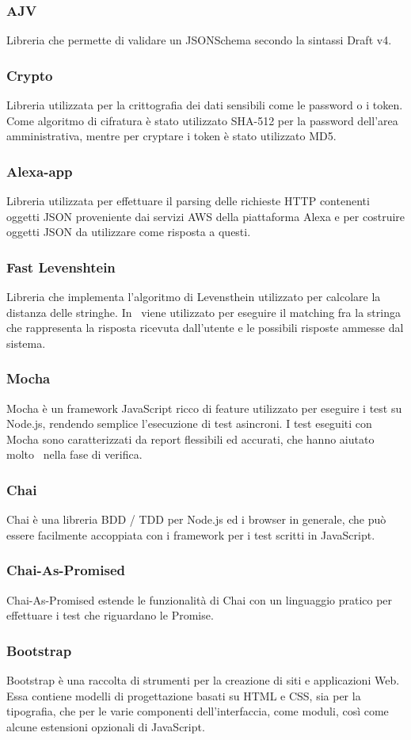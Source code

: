 \documentclass[../ManualeSviluppatore_v1.0.0.tex]{subfiles}
\begin{document}
		\subsubsection{AJV}
			Libreria che permette di validare un JSONSchema secondo la sintassi Draft v4.
		\subsubsection{Crypto}
			Libreria utilizzata per la crittografia dei dati sensibili come le password o i token. Come algoritmo di cifratura è stato utilizzato SHA-512 per la password dell'area amministrativa, mentre per cryptare i token è stato utilizzato MD5.
		\subsubsection{Alexa-app}
			Libreria utilizzata per effettuare il \gls{parsing} delle richieste HTTP contenenti oggetti JSON proveniente dai servizi AWS della piattaforma Alexa e per costruire oggetti JSON da utilizzare come risposta a questi.
		\subsubsection{Fast Levenshtein}
			Libreria che implementa l'algoritmo di Levensthein utilizzato per calcolare la distanza delle stringhe. In \atavi\ viene utilizzato per eseguire il \gls{matching} fra la stringa che rappresenta la risposta ricevuta dall'utente e le possibili risposte ammesse dal sistema.
		\subsubsection{Mocha}
			Mocha è un framework JavaScript ricco di feature utilizzato per eseguire i test su Node.js, rendendo semplice l'esecuzione di test asincroni. I test eseguiti con Mocha sono caratterizzati da \gls{report} flessibili ed accurati, che hanno aiutato molto \kpanic\ nella fase di verifica.
		\subsubsection{Chai}
			Chai è una libreria BDD / TDD per Node.js ed i browser in generale, che può essere facilmente accoppiata con i framework per i test scritti in JavaScript.
		\subsubsection{Chai-As-Promised}
			Chai-As-Promised estende le funzionalità di Chai con un linguaggio pratico per effettuare i test che riguardano le \gls{Promise}.
		\subsubsection{Bootstrap}
			Bootstrap è una raccolta di strumenti per la creazione di siti e applicazioni Web. Essa contiene modelli di progettazione basati su HTML e CSS, sia per la tipografia, che per le varie componenti dell'interfaccia, come moduli, così come alcune estensioni opzionali di JavaScript.
\end{document}
